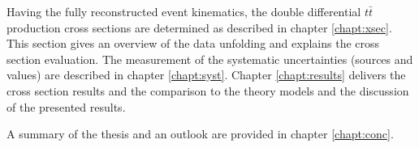 Having the fully reconstructed event kinematics, the double differential $t\bar{t}$ production cross sections are determined
as described in chapter \ref{chapt:xsec}. This section gives an overview of the data unfolding and explains the cross section evaluation. 
The measurement of the systematic uncertainties (sources and values) are described in chapter \ref{chapt:syst}. Chapter \ref{chapt:results} 
delivers the cross section results and the comparison to the theory models and the discussion of the presented results.

A summary of the thesis and an outlook are provided in chapter \ref{chapt:conc}.